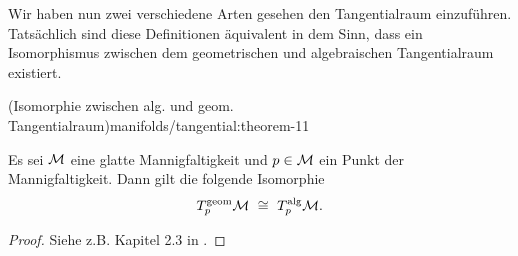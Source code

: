 \par
Wir haben nun zwei verschiedene Arten gesehen den Tangentialraum einzuführen.
Tatsächlich sind diese Definitionen äquivalent in dem Sinn, dass ein Isomorphismus zwischen dem geometrischen und algebraischen Tangentialraum existiert.
\begin{theorem}{(Isomorphie zwischen alg. und geom. Tangentialraum)}{manifolds/tangential:theorem-11}



\par
Es sei \(\mathcal{M}\) eine glatte Mannigfaltigkeit und \(p\in\mathcal{M}\) ein Punkt der Mannigfaltigkeit.
Dann gilt die folgende Isomorphie
\begin{align*}
T^{\text{geom}}_p\mathcal{M} \ \cong \ T^{\text{alg}}_p\mathcal{M}.
\end{align*}\end{theorem}

\begin{proof}
 Siehe z.B. Kapitel 2.3 in \cite{Janich03}.
\end{proof}


